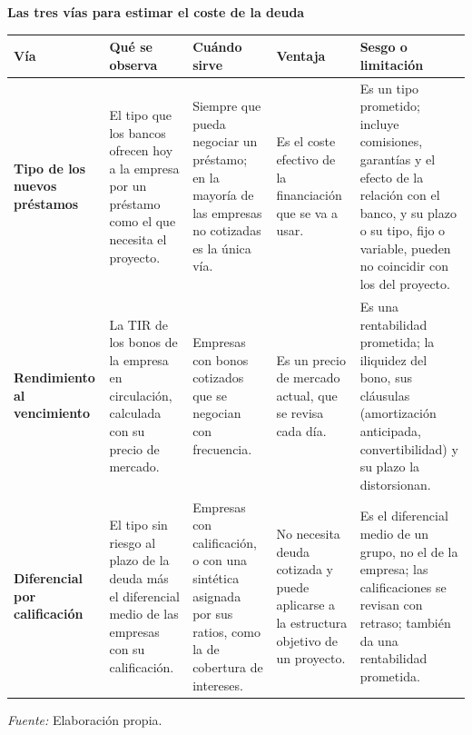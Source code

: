 \documentclass[10pt,a4paper]{article}
\begin{document}
\begin{center}
\begin{minipage}{\linewidth}
\centering
{\small\textbf{Las tres vías para estimar el coste de la deuda}}\par\vspace{0.4em}
{\footnotesize
\setlength{\tabcolsep}{3pt}
\renewcommand{\arraystretch}{1.35}
\begin{tabular}{p{2.3cm}p{3.3cm}p{2.9cm}p{2.8cm}p{3.3cm}}
\hline
\textbf{Vía} & \textbf{Qué se observa} & \textbf{Cuándo sirve} & \textbf{Ventaja} & \textbf{Sesgo o limitación}\tabularnewline
\hline
\raggedright\textbf{Tipo de los nuevos préstamos} & \raggedright El tipo que los bancos ofrecen hoy a la empresa por un préstamo como el que necesita el proyecto. & \raggedright Siempre que pueda negociar un préstamo; en la mayoría de las empresas no cotizadas es la única vía. & \raggedright Es el coste efectivo de la financiación que se va a usar. & \raggedright Es un tipo prometido; incluye comisiones, garantías y el efecto de la relación con el banco, y su plazo o su tipo, fijo o variable, pueden no coincidir con los del proyecto.\tabularnewline
\hline
\raggedright\textbf{Rendimiento al vencimiento} & \raggedright La TIR de los bonos de la empresa en circulación, calculada con su precio de mercado. & \raggedright Empresas con bonos cotizados que se negocian con frecuencia. & \raggedright Es un precio de mercado actual, que se revisa cada día. & \raggedright Es una rentabilidad prometida; la iliquidez del bono, sus cláusulas (amortización anticipada, convertibilidad) y su plazo la distorsionan.\tabularnewline
\hline
\raggedright\textbf{Diferencial por calificación} & \raggedright El tipo sin riesgo al plazo de la deuda más el diferencial medio de las empresas con su calificación. & \raggedright Empresas con calificación, o con una sintética asignada por sus ratios, como la de cobertura de intereses. & \raggedright No necesita deuda cotizada y puede aplicarse a la estructura objetivo de un proyecto. & \raggedright Es el diferencial medio de un grupo, no el de la empresa; las calificaciones se revisan con retraso; también da una rentabilidad prometida.\tabularnewline
\hline
\end{tabular}}\par\vspace{0.4em}
{\small\textit{Fuente: }Elaboración propia.}
\end{minipage}
\end{center}
\end{document}
